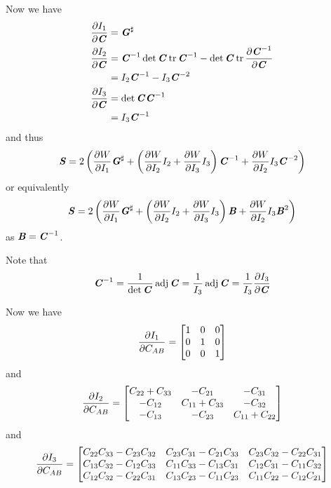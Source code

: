 Now we have
\begin{align}
   \dfrac{\partial I_{1}}{\partial \boldsymbol{\mathit{C}}} &= \boldsymbol{\mathit{G}}^{\sharp} \\
   \dfrac{\partial I_{2}}{\partial \boldsymbol{\mathit{C}}} &={\boldsymbol{\mathit{C}}}^{-1}\det\boldsymbol{\mathit{C}}\operatorname{tr}{\boldsymbol{\mathit{C}}}^{-1}-\det\boldsymbol{\mathit{C}}\operatorname{tr} \dfrac{\partial {\ensuremath{\boldsymbol{\mathit{C}}}}^{-1}}{\partial \boldsymbol{\mathit{C}}} \\
  &=I_{2}{\boldsymbol{\mathit{C}}}^{-1}-I_{3} {\boldsymbol{\mathit{C}}}^{-2}  \\
   \dfrac{\partial I_{3}}{\partial \boldsymbol{\mathit{C}}} &=\det\boldsymbol{\mathit{C}}{\boldsymbol{\mathit{C}}}^{-1} \\
  &= I_{3}{\boldsymbol{\mathit{C}}}^{-1} 
\end{align}
and thus
\begin{equation}
  \boldsymbol{\mathit{S}}=2\left(  \dfrac{\partial W}{\partial I_{1}}  \boldsymbol{\mathit{G}}^{\sharp} +\left(  \dfrac{\partial W}{\partial I_{2}} I_{2}+ \dfrac{\partial W}{\partial I_{3}} I_{3} \right){\boldsymbol{\mathit{C}}}^{-1}+ \dfrac{\partial W}{\partial I_{2}} I_{3} {\boldsymbol{\mathit{C}}}^{-2}  \right)
\end{equation}
or equivalently
\begin{equation}
  \boldsymbol{\mathit{S}}=2\left(  \dfrac{\partial W}{\partial I_{1}}  \boldsymbol{\mathit{G}}^{\sharp} +\left(  \dfrac{\partial W}{\partial I_{2}} I_{2}+ \dfrac{\partial W}{\partial I_{3}} I_{3} \right)\boldsymbol{\mathit{B}}+ \dfrac{\partial W}{\partial I_{2}} I_{3}\boldsymbol{\mathit{B}}^{2} \right)
\end{equation}
as $\boldsymbol{\mathit{B}}={\boldsymbol{\mathit{C}}}^{-1}$.

Note that
\begin{equation}
  {\ensuremath{\boldsymbol{\mathit{C}}}}^{-1}=\dfrac{1}{\det\boldsymbol{\mathit{C}}}\operatorname{adj}\boldsymbol{\mathit{C}}=\dfrac{1}{I_{3}}\operatorname{adj}\boldsymbol{\mathit{C}}=\dfrac{1}{I_{3}} \dfrac{\partial I_{3}}{\partial \boldsymbol{\mathit{C}}} 
\end{equation}

Now we have
\begin{equation}
   \dfrac{\partial I_{1}}{\partial C_{AB}} =\begin{bmatrix}
    1 & 0 & 0 \\
    0 & 1 & 0 \\
    0 & 0 & 1
  \end{bmatrix}
\end{equation}
and
\begin{equation}
   \dfrac{\partial I_{2}}{\partial C_{AB}} =\begin{bmatrix}
    C_{22}+C_{33} & -C_{21} & -C_{31} \\
    -C_{12} & C_{11}+C_{33} & -C_{32} \\
    -C_{13} & -C_{23} & C_{11}+C_{22}
  \end{bmatrix}
\end{equation}
and
\begin{equation}
   \dfrac{\partial I_{3}}{\partial C_{AB}} =\begin{bmatrix}
    C_{22}C_{33}-C_{23}C_{32} & C_{23}C_{31}-C_{21}C_{33} & C_{23}C_{32}-C_{22}C_{31} \\
    C_{13}C_{32}-C_{12}C_{33} & C_{11}C_{33}-C_{13}C_{31} & C_{12}C_{31}-C_{11}C_{32} \\
    C_{12}C_{32}-C_{22}C_{31} & C_{13}C_{23}-C_{11}C_{23} & C_{11}C_{22}-C_{12}C_{21}
  \end{bmatrix}
\end{equation}

